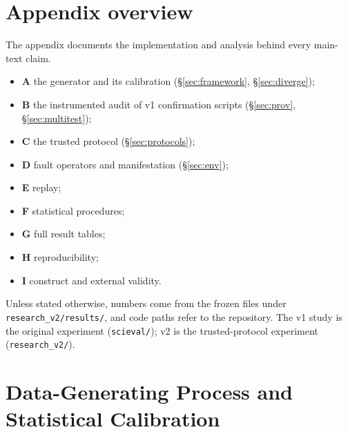 \section*{Appendix overview}
The appendix documents the implementation and analysis behind every
main-text claim.
\begin{itemize}
\item \textbf{A} the generator and its calibration (\S\ref{sec:framework},
\S\ref{sec:diverge});
\item \textbf{B} the instrumented audit of v1 confirmation scripts
(\S\ref{sec:prov}, \S\ref{sec:multitest});
\item \textbf{C} the trusted protocol (\S\ref{sec:protocols});
\item \textbf{D} fault operators and manifestation (\S\ref{sec:env});
\item \textbf{E} replay;
\item \textbf{F} statistical procedures;
\item \textbf{G} full result tables;
\item \textbf{H} reproducibility;
\item \textbf{I} construct and external validity.
\end{itemize}
Unless stated otherwise, numbers come from the frozen files under
\texttt{research\_v2/results/}, and code paths refer to the repository. The
v1 study is the original experiment (\texttt{scieval/}); v2 is the
trusted-protocol experiment (\texttt{research\_v2/}).

\section{Data-Generating Process and Statistical Calibration}
\label{app:dgp}


